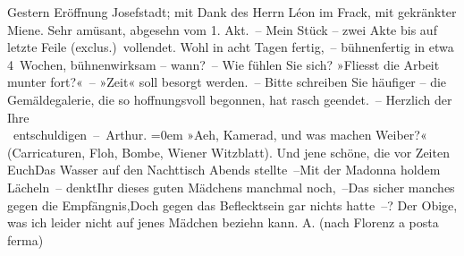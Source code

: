 \begin{ledgroupsized}[t]{13cm}
           \pstart
           Gestern Eröffnung Josefstadt; mit Dank des Herrn Léon im Frack, mit gekränkter Miene. Sehr amüsant,
               abgesehn vom 1. Akt. –\pend
           \pstart
           Mein Stück – zwei Akte bis auf
               letzte Feile (exclus.) vollendet. Wohl in acht Tagen fertig, – bühnenfertig in etwa
               4 Wochen, bühnenwirksam – wann? –\pend
           \pstart
           Wie fühlen Sie sich? »Fliesst die Arbeit munter fort?« –\pend
           \pstart
           {\pb}»Zeit«
               soll besorgt werden. – Bitte schreiben Sie häufiger – die Gemäldegalerie, die so
               hoffnungsvoll begonnen, hat rasch geendet. –\pend
           \pstart
           Herzlich der Ihre{\\[\baselineskip]}\spacefill\mbox{ entschuldigen – Arthur.}\pend
           \leftskip=0em{}\pstart
           \noindent{}»Aeh, Kamerad, und was machen Weiber?« (Carricaturen, Floh, Bombe, Wiener
                  Witzblatt).\pend
           \stanza{}Und jene schöne, die vor Zeiten Euch\newverse{}Das Wasser auf den Nachttisch Abends stellte –\newverse{}Mit der Madonna holdem Lächeln – denkt\newverse{}Ihr dieses guten Mädchens manchmal noch, –\newverse{}Das sicher manches gegen die Empfängnis,\newverse{}Doch gegen das Beflecktsein gar nichts hatte –?\stanzaend{}\pstart
           Der Obige, was ich leider nicht auf jenes Mädchen beziehn kann.\pend
           \pstart
           \spacefill\mbox{A.}\pend
           \pstart
           (nach Florenz a posta ferma)\pend
           \endnumbering{}\end{ledgroupsized}  \newcommand{\dateiname}{L00374}\newcommand{\titel}{Arthur Schnitzler an Richard Beer-Hofmann, 29. 9. 1894}\newcommand{\editorInnen}{Martin Anton Müller und Gerd-Hermann Susen}
      